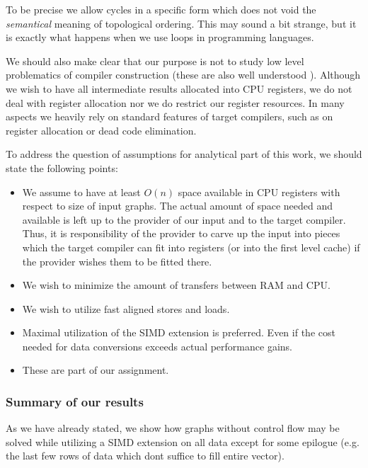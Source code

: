 

\begin{rem}
  To be precise we allow cycles in a specific form which does not void the \emph{semantical} meaning of topological ordering. This may sound a bit strange, but it is exactly what happens when we use loops in programming languages.
\end{rem}


  We should also make clear that our purpose is not to study low level problematics of compiler construction (these are also well understood \cite{compiler_theory}). Although we wish to have all intermediate results allocated into CPU registers, we do not deal with register allocation nor we do restrict our register resources. In many aspects we heavily rely on standard features of target compilers, such as on register allocation or dead code elimination.


To address the question of assumptions for analytical part of this work, we should state the following points:
\begin{itemize}
  \item We assume to have at least $O(n)$ space available in CPU registers with respect to size of input graphs. The actual amount of space needed and available is left up to the provider of our input and to the target compiler. Thus, it is responsibility of the provider to carve up the input into pieces which the target compiler can fit into registers (or into the first level cache) if the provider wishes them to be fitted there.
  \item We wish to minimize the amount of transfers between RAM and CPU.
  \item We wish to utilize fast aligned stores and loads.
  \item Maximal utilization of the SIMD extension is preferred. Even if the cost needed for data conversions exceeds actual performance gains.
  \item These are part of our assignment.
\end{itemize}

\subsubsection{Summary of our results}

  As we have already stated, we show how graphs without control flow may be solved while utilizing a SIMD extension on all data except for some epilogue (e.g. the last few rows of data which dont suffice to fill entire vector). 


